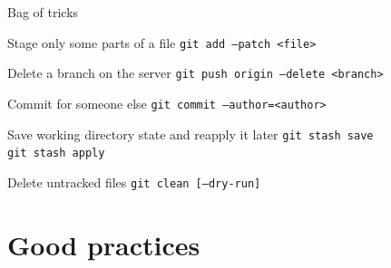 \documentclass{beamer}
\begin{document}
\begin{frame}{Bag of tricks}
  \begin{block}{Stage only some parts of a file}
    \texttt{git add --patch <file>}
  \end{block}
  \begin{block}{Delete a branch on the server}
    \texttt{git push origin --delete <branch>}
  \end{block}
  \begin{block}{Commit for someone else}
    \texttt{git commit --author=<author>}
  \end{block}
  \begin{block}{Save working directory state and reapply it later}
    \texttt{git stash save}\\\texttt{git stash apply}
  \end{block}
  \begin{block}{Delete untracked files}
    \texttt{git clean [--dry-run]}
  \end{block}
\end{frame}

\section{Good practices}

\end{document}
